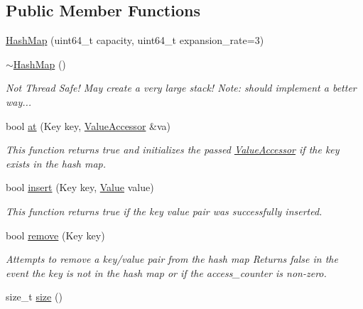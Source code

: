 \subsection*{Public Member Functions}
\begin{DoxyCompactItemize}
\item 
\hyperlink{classtervel_1_1containers_1_1wf_1_1_hash_map_ad8c150cd36ed719afb858430337f1c62}{Hash\+Map} (uint64\+\_\+t capacity, uint64\+\_\+t expansion\+\_\+rate=3)
\item 
\hyperlink{classtervel_1_1containers_1_1wf_1_1_hash_map_ae794cb0541447e72830673a22f541ca8}{$\sim$\+Hash\+Map} ()
\begin{DoxyCompactList}\small\item\em Not Thread Safe! May create a very large stack! Note\+: should implement a better way... \end{DoxyCompactList}\item 
bool \hyperlink{classtervel_1_1containers_1_1wf_1_1_hash_map_a4c1495c1d9bcdef760f0a4d973778d57}{at} (Key key, \hyperlink{classtervel_1_1containers_1_1wf_1_1_hash_map_1_1_value_accessor}{Value\+Accessor} \&va)
\begin{DoxyCompactList}\small\item\em This function returns true and initializes the passed \hyperlink{classtervel_1_1containers_1_1wf_1_1_hash_map_1_1_value_accessor}{Value\+Accessor} if the key exists in the hash map. \end{DoxyCompactList}\item 
bool \hyperlink{classtervel_1_1containers_1_1wf_1_1_hash_map_aa987d6abf872d3fb51a714fa9c3da047}{insert} (Key key, \hyperlink{hash__map_2test_object_8h_ad777bf08d8e2b01df17ba5e3c51ae11f}{Value} value)
\begin{DoxyCompactList}\small\item\em This function returns true if the key value pair was successfully inserted. \end{DoxyCompactList}\item 
bool \hyperlink{classtervel_1_1containers_1_1wf_1_1_hash_map_ad4c3355a93bdec5af4d8dba02b9bd02a}{remove} (Key key)
\begin{DoxyCompactList}\small\item\em Attempts to remove a key/value pair from the hash map Returns false in the event the key is not in the hash map or if the access\+\_\+counter is non-\/zero. \end{DoxyCompactList}\item 
size\+\_\+t \hyperlink{classtervel_1_1containers_1_1wf_1_1_hash_map_a2fb368a522433b4a96c8d4ac7feb7a78}{size} ()

\end{DoxyCompactItemize}
